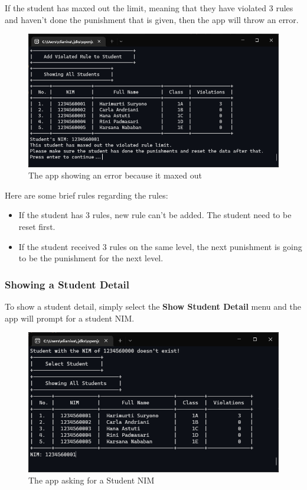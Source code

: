\documentclass[12pt,titlepage]{article}
\begin{document}
If the student has maxed out the limit, meaning that they have violated 3 rules and haven't done
the punishment that is given, then the app will throw an error.

\begin{figure}[h]
    \centering
    \includegraphics[width=.8\textwidth]{images/add-student-rule-max.png}
    \caption{The app showing an error because it maxed out}
\end{figure}

\pagebreak

Here are some brief rules regarding the rules:
\begin{itemize}
    \item If the student has 3 rules, new rule can't be added. The student need to be reset first.
    \item If the student received 3 rules on the same level, the next punishment is going to be the punishment for the next level.
\end{itemize}

\subsubsection{Showing a Student Detail}
To show a student detail, simply select the \textbf{Show Student Detail} menu and the app will prompt for a student NIM.

\begin{figure}[h]
    \centering
    \includegraphics[width=.8\textwidth]{images/show-student-input.png}
    \caption{The app asking for a Student NIM}
\end{figure}
\end{document}

